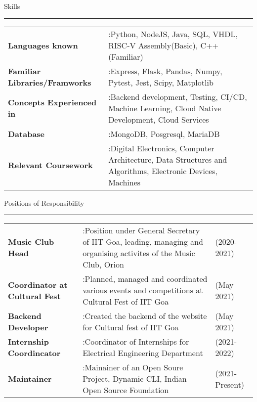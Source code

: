 \documentclass[10pt, hidelinks]{article}
\begin{document}

	{\large\color{RoyalBlue}Skills}
	\par\noindent\rule[7pt]{\textwidth}{0.1pt}
	\begin{center}
		{\vspace*{-3mm}\small \vspace*{-5mm}
		\begin{tabular}{ m{} m{}}
			\textbf{Languages known} & :Python, NodeJS, Java, SQL, VHDL, RISC-V Assembly(Basic), C++(Familiar) \\
			\textbf{Familiar Libraries/Framworks} & :Express, Flask, Pandas, Numpy, Pytest, Jest, Scipy, Matplotlib \\
			\textbf{Concepts Experienced in} & :Backend development, Testing, CI/CD, Machine Learning, Cloud Native Development, Cloud Services \\
			\textbf{Database} & :MongoDB, Posgresql, MariaDB \\
			\textbf{Relevant Coursework} & :Digital Electronics, Computer Architecture, Data Structures and Algorithms, Electronic Devices, Machines \\
		\end{tabular}
		}
	\end{center}


	{\large\color{RoyalBlue}Positions of Responsibility}
	\par\noindent\rule[7pt]{\textwidth}{0.1pt}
	\begin{center}
		{\vspace*{-3mm}\small \vspace*{-5mm}
		\begin{tabular}{ m{} m{} m{}}
			\textbf{Music Club Head} & :Position under General Secretary of IIT Goa, leading, managing and organising activites of the Music Club, Orion & (2020-2021) \\
			\textbf{Coordinator at Cultural Fest} & :Planned, managed and coordinated various events and competitions at Cultural Fest of IIT Goa & (May 2021) \\
			\textbf{Backend Developer} & :Created the backend of the website for Cultural fest of IIT Goa & (May 2021) \\
			\textbf{Internship Coordincator} & :Coordinator of Internships for Electrical Engineering Department & (2021-2022) \\
			\textbf{Maintainer} & :Mainainer of an Open Soure Project, Dynamic CLI, Indian Open Source Foundation & (2021-Present) \\
		\end{tabular}
		}
	\end{center}
\end{document}
